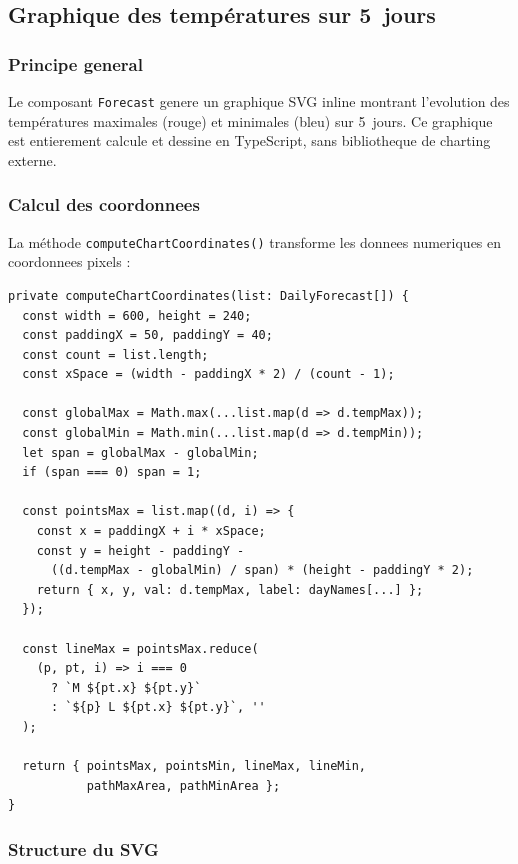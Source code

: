 \documentclass[12pt,a4paper]{article}
\begin{document}
\subsection{Graphique des températures sur 5~jours}

\subsubsection{Principe general}

Le composant \texttt{Forecast} genere un graphique SVG inline montrant l'evolution des températures maximales (rouge) et minimales (bleu) sur 5~jours. Ce graphique est entierement calcule et dessine en TypeScript, sans bibliotheque de charting externe.

\subsubsection{Calcul des coordonnees}

La méthode \texttt{computeChartCoordinates()} transforme les donnees numeriques en coordonnees pixels :

\begin{lstlisting}[style=angular, caption={Calcul des coordonnees SVG}]
private computeChartCoordinates(list: DailyForecast[]) {
  const width = 600, height = 240;
  const paddingX = 50, paddingY = 40;
  const count = list.length;
  const xSpace = (width - paddingX * 2) / (count - 1);

  const globalMax = Math.max(...list.map(d => d.tempMax));
  const globalMin = Math.min(...list.map(d => d.tempMin));
  let span = globalMax - globalMin;
  if (span === 0) span = 1;

  const pointsMax = list.map((d, i) => {
    const x = paddingX + i * xSpace;
    const y = height - paddingY -
      ((d.tempMax - globalMin) / span) * (height - paddingY * 2);
    return { x, y, val: d.tempMax, label: dayNames[...] };
  });

  const lineMax = pointsMax.reduce(
    (p, pt, i) => i === 0
      ? `M ${pt.x} ${pt.y}`
      : `${p} L ${pt.x} ${pt.y}`, ''
  );

  return { pointsMax, pointsMin, lineMax, lineMin,
           pathMaxArea, pathMinArea };
}
\end{lstlisting}

\subsubsection{Structure du SVG}
\end{document}
